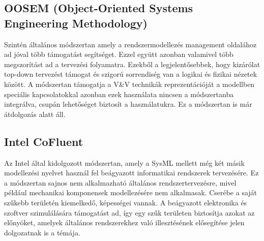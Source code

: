     \subsection{OOSEM (Object-Oriented Systems Engineering Methodology)} \cite{autoEEsystemEngineer2024}
    Szintén általános módszertan amely a rendszermodellezés management oldalához ad jóval több támogatást segítséget.
    Ezzel együtt azonban valamivel több megszorítást ad a tervezési folyamatra. Ezekből a legjelentősebbek, hogy kizárólat top-down tervezést támogat és szigorú sorrendiség van a logikai és fizikai nézetek között.
    A módszertan támogatja a V\&V technikák reprezentációját a modellben  speciális kapcsolatokkal azonban ezek használata nincsen a módszertanba integrálva, csupán lehetőséget biztosít a használatukra.
    Ez a módszertan is már átdolgozás alatt áll.

    \subsection{Intel CoFluent} \cite{IntelCorporation2014}
    Az Intel által kidolgozott módszertan, amely a SysML mellett még két másik modellezési nyelvet használ fel beágyazott informatikai rendszerek tervezésére. Ez a módszertan sajnos nem alkalmazható általános rendszertervezésre, mivel például mechanikai komponensek modellezésére nem alkalmasak.
    Cserébe a saját szűkebb területén kiemelkedő, képességei vannak. A beágyazott elektronika és szoftver szimulálására támogatást ad, így egy szűk területen biztosítja azokat az előnyöket, amelyek általános rendszerekhez való illesztésének elősegítése jelen dolgozatnak is a témája.